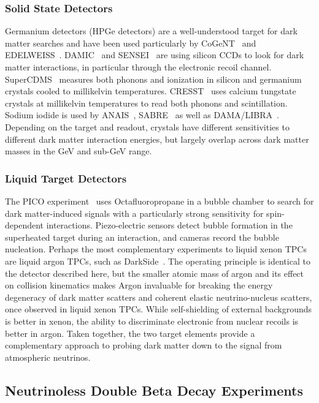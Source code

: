 \subsubsection{Solid State Detectors}

Germanium detectors (HPGe detectors) are a well-understood target for dark matter searches and have been used particularly by CoGeNT~\cite{Aalseth:2014eft} and EDELWEISS~\cite{Shields:2015wka}. DAMIC~\cite{Aguilar-Arevalo:2016ndq} and SENSEI~\cite{Crisler:2018gci} are using silicon CCDs to look for dark matter interactions, in particular through the electronic recoil channel. SuperCDMS~\cite{Agnese:2014aze} measures both phonons and ionization in silicon and germanium crystals cooled to millikelvin temperatures. CRESST~\cite{CRESST:2019jnq} uses calcium tungstate crystals at millikelvin temperatures to read both phonons and scintillation. Sodium iodide is used by ANAIS~\cite{Amare:2021yyu}, SABRE~\cite{Shields:2015wka} as well as DAMA/LIBRA~\cite{Bernabei:2006tw}. Depending on the target and readout, crystals have different sensitivities to different dark matter interaction energies, but largely overlap across dark matter masses in the GeV and sub-GeV range.

\subsubsection{Liquid Target Detectors}

The PICO experiment~\cite{Amole:2017dex} uses Octafluoropropane in a bubble chamber to search for dark matter-induced signals with a particularly strong sensitivity for spin-dependent interactions. Piezo-electric sensors detect bubble formation in the superheated target during an interaction, and cameras record the bubble nucleation. Perhaps the most complementary experiments to liquid xenon TPCs are liquid argon TPCs, such as DarkSide~\cite{Aalseth:2018gq}. The operating principle is identical to the detector described here, but the smaller atomic mass of argon and its effect on collision kinematics makes Argon invaluable for breaking the energy degeneracy of dark matter scatters and coherent elastic neutrino-nucleus scatters, once observed in liquid xenon TPCs. While self-shielding of external backgrounds is better in xenon, the ability to discriminate electronic from nuclear recoils is better in argon. Taken together, the two target elements provide a complementary approach to probing dark matter down to the signal from atmospheric neutrinos. 

\subsection{Neutrinoless Double Beta Decay Experiments}

